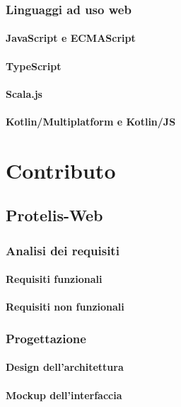 \documentclass[%
  a4paper,                %
  12pt,                   %
  twoside,                %
  openright,              %
  titlepage,              %
  final                   %
]{scrbook}
\begin{document}
      \section{Linguaggi ad uso web}
        \subsection{JavaScript e ECMAScript}
        \subsection{TypeScript}
        \subsection{Scala.js}
        \subsection{Kotlin/Multiplatform e Kotlin/JS}

  \part{Contributo}
    \chapter{Protelis-Web}
      \section{Analisi dei requisiti}
        \subsection{Requisiti funzionali}
        \subsection{Requisiti non funzionali}
      \section{Progettazione}
        \subsection{Design dell'architettura}
        \subsection{Mockup dell'interfaccia}
\end{document}
